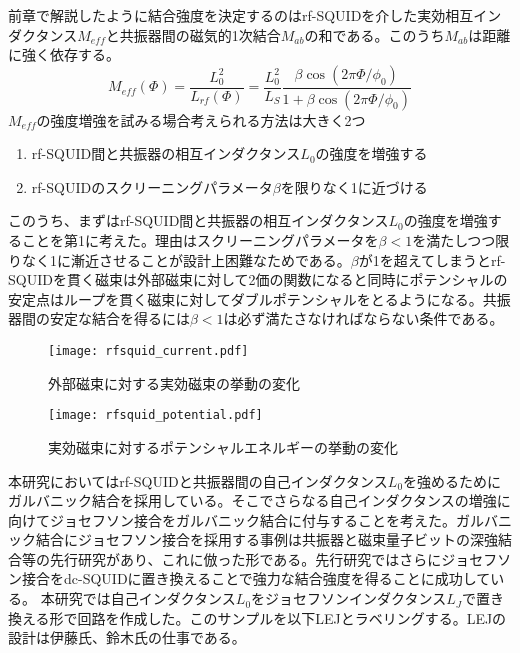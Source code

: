 前章で解説したように結合強度を決定するのはrf-SQUIDを介した実効相互インダクタンス$M_{eff}$と共振器間の磁気的1次結合$M_{ab}$の和である。このうち$M_{ab}$は距離に強く依存する。
\begin{equation}
    M_{eff}(\Phi)  = \frac{L_0^2}{L_{rf}(\Phi)}=\frac{L_0^2}{L_{S}} \frac{\beta \cos \left(2 \pi \Phi/\phi_{0}\right)}{1+\beta \cos \left(2 \pi \Phi/\phi_{0}\right)}
\end{equation}
$M_{eff}$の強度増強を試みる場合考えられる方法は大きく2つ
\begin{enumerate}
    \item rf-SQUID間と共振器の相互インダクタンス$L_0$の強度を増強する
    \item rf-SQUIDのスクリーニングパラメータ$\beta$を限りなく1に近づける
 \end{enumerate}
このうち、まずはrf-SQUID間と共振器の相互インダクタンス$L_0$の強度を増強することを第1に考えた。理由はスクリーニングパラメータを$\beta<1$を満たしつつ限りなく1に漸近させることが設計上困難なためである。$\beta$が1を超えてしまうとrf-SQUIDを貫く磁束は外部磁束に対して2価の関数になると同時にポテンシャルの安定点はループを貫く磁束に対してダブルポテンシャルをとるようになる。共振器間の安定な結合を得るには$\beta<1$は必ず満たさなければならない条件である。
\begin{figure}[H]
    \begin{minipage}[t]{0.5\columnwidth}
        \centering
        \texttt{[image: rfsquid\_current.pdf]}
        \caption{外部磁束に対する実効磁束の挙動の変化}
    \end{minipage}%
    \begin{minipage}[t]{0.5\columnwidth}
        \centering
        \texttt{[image: rfsquid\_potential.pdf]}
        \caption{実効磁束に対するポテンシャルエネルギーの挙動の変化}
    \end{minipage}
\end{figure}
本研究においてはrf-SQUIDと共振器間の自己インダクタンス$L_0$を強めるためにガルバニック結合を採用している。そこでさらなる自己インダクタンスの増強に向けてジョセフソン接合をガルバニック結合に付与することを考えた。ガルバニック結合にジョセフソン接合を採用する事例は共振器と磁束量子ビットの深強結合等の先行研究\cite*{Yoshihara2017}があり、これに倣った形である。先行研究ではさらにジョセフソン接合をdc-SQUIDに置き換えることで強力な結合強度を得ることに成功している。
本研究では自己インダクタンス$L_0$をジョセフソンインダクタンス$L_J$で置き換える形で回路を作成した。このサンプルを以下LEJとラベリングする。LEJの設計は伊藤氏、鈴木氏の仕事である。
